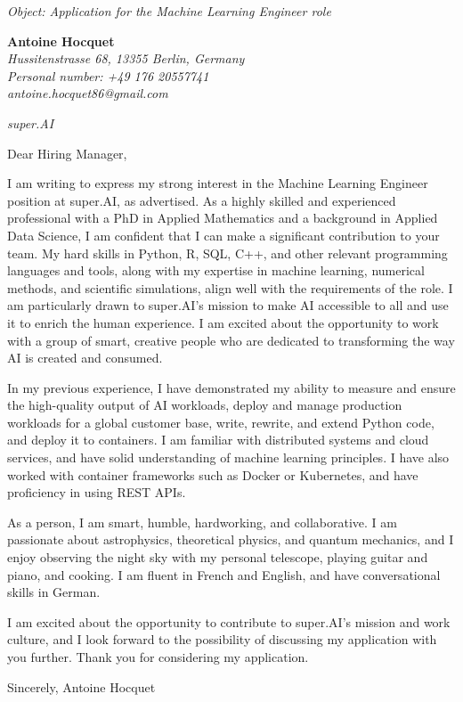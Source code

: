 \documentclass[12pt]{letter}
\begin{document}
\begin{letter}{ \itshape Object: Application for the Machine Learning Engineer role }
\hfill
\begin{flushleft}
    {\bfseries Antoine Hocquet }\\[.35ex]
    \small\itshape
    Hussitenstrasse 68, 13355 Berlin, Germany\\
    Personal number: +49 176 20557741\\
    antoine.hocquet86@gmail.com
\end{flushleft}

\hfill
\begin{flushright}
    \itshape super.AI \\
\end{flushright}

\opening{ Dear Hiring Manager, }

I am writing to express my strong interest in the Machine Learning Engineer position at super.AI, as advertised. As a highly skilled and experienced professional with a PhD in Applied Mathematics and a background in Applied Data Science, I am confident that I can make a significant contribution to your team. My hard skills in Python, R, SQL, C++, and other relevant programming languages and tools, along with my expertise in machine learning, numerical methods, and scientific simulations, align well with the requirements of the role. I am particularly drawn to super.AI's mission to make AI accessible to all and use it to enrich the human experience. I am excited about the opportunity to work with a group of smart, creative people who are dedicated to transforming the way AI is created and consumed.

In my previous experience, I have demonstrated my ability to measure and ensure the high-quality output of AI workloads, deploy and manage production workloads for a global customer base, write, rewrite, and extend Python code, and deploy it to containers. I am familiar with distributed systems and cloud services, and have solid understanding of machine learning principles. I have also worked with container frameworks such as Docker or Kubernetes, and have proficiency in using REST APIs.

As a person, I am smart, humble, hardworking, and collaborative. I am passionate about astrophysics, theoretical physics, and quantum mechanics, and I enjoy observing the night sky with my personal telescope, playing guitar and piano, and cooking. I am fluent in French and English, and have conversational skills in German.

I am excited about the opportunity to contribute to super.AI's mission and work culture, and I look forward to the possibility of discussing my application with you further. Thank you for considering my application.

\closing{ Sincerely, Antoine Hocquet }

\end{letter}
\end{document}
